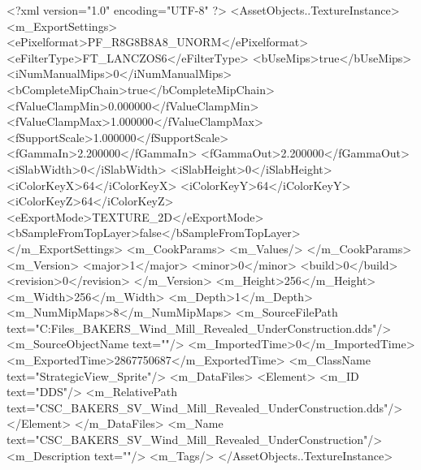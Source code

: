 <?xml version="1.0" encoding="UTF-8" ?>
<AssetObjects..TextureInstance>
	<m_ExportSettings>
		<ePixelformat>PF_R8G8B8A8_UNORM</ePixelformat>
		<eFilterType>FT_LANCZOS6</eFilterType>
		<bUseMips>true</bUseMips>
		<iNumManualMips>0</iNumManualMips>
		<bCompleteMipChain>true</bCompleteMipChain>
		<fValueClampMin>0.000000</fValueClampMin>
		<fValueClampMax>1.000000</fValueClampMax>
		<fSupportScale>1.000000</fSupportScale>
		<fGammaIn>2.200000</fGammaIn>
		<fGammaOut>2.200000</fGammaOut>
		<iSlabWidth>0</iSlabWidth>
		<iSlabHeight>0</iSlabHeight>
		<iColorKeyX>64</iColorKeyX>
		<iColorKeyY>64</iColorKeyY>
		<iColorKeyZ>64</iColorKeyZ>
		<eExportMode>TEXTURE_2D</eExportMode>
		<bSampleFromTopLayer>false</bSampleFromTopLayer>
	</m_ExportSettings>
	<m_CookParams>
		<m_Values/>
	</m_CookParams>
	<m_Version>
		<major>1</major>
		<minor>0</minor>
		<build>0</build>
		<revision>0</revision>
	</m_Version>
	<m_Height>256</m_Height>
	<m_Width>256</m_Width>
	<m_Depth>1</m_Depth>
	<m_NumMipMaps>8</m_NumMipMaps>
	<m_SourceFilePath text="C:\Users\Shadow\Desktop\Working Files\Icons\StrategicView\CSC_BAKERS_Wind_Mill_Revealed_UnderConstruction.dds"/>
	<m_SourceObjectName text=""/>
	<m_ImportedTime>0</m_ImportedTime>
	<m_ExportedTime>2867750687</m_ExportedTime>
	<m_ClassName text="StrategicView_Sprite"/>
	<m_DataFiles>
		<Element>
			<m_ID text="DDS"/>
			<m_RelativePath text="CSC_BAKERS_SV_Wind_Mill_Revealed_UnderConstruction.dds"/>
		</Element>
	</m_DataFiles>
	<m_Name text="CSC_BAKERS_SV_Wind_Mill_Revealed_UnderConstruction"/>
	<m_Description text=""/>
	<m_Tags/>
</AssetObjects..TextureInstance>

